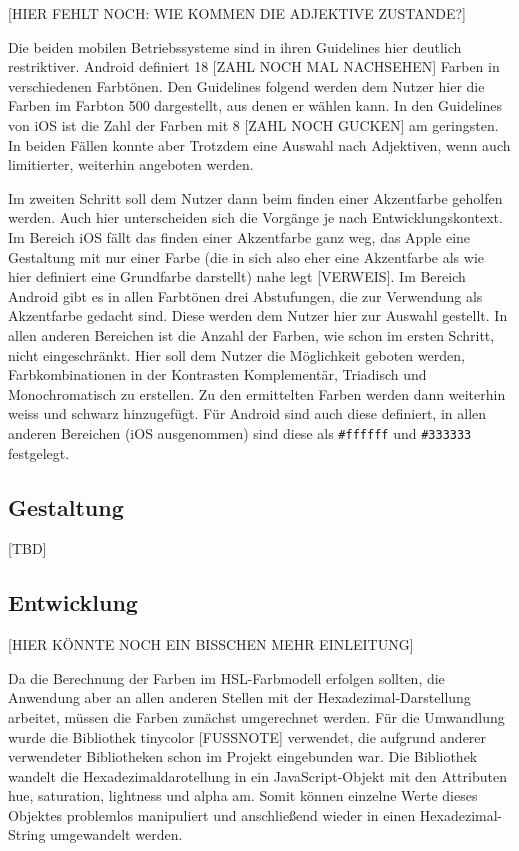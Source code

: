 [HIER FEHLT NOCH: WIE KOMMEN DIE ADJEKTIVE ZUSTANDE?]

Die beiden mobilen Betriebssysteme sind in ihren Guidelines hier deutlich restriktiver. Android definiert 18 [ZAHL NOCH MAL NACHSEHEN] Farben in verschiedenen Farbtönen. Den Guidelines folgend werden dem Nutzer hier die Farben im Farbton 500 dargestellt, aus denen er wählen kann.
In den Guidelines von iOS ist die Zahl der Farben mit 8 [ZAHL NOCH GUCKEN] am geringsten.
In beiden Fällen konnte aber Trotzdem eine Auswahl nach Adjektiven, wenn auch limitierter, weiterhin angeboten werden.

Im zweiten Schritt soll dem Nutzer dann beim finden einer Akzentfarbe geholfen werden. Auch hier unterscheiden sich die Vorgänge je nach Entwicklungskontext.
Im Bereich iOS fällt das finden einer Akzentfarbe ganz weg, das Apple eine Gestaltung mit nur einer Farbe (die in sich also eher eine Akzentfarbe als wie hier definiert eine Grundfarbe darstellt) nahe legt [VERWEIS].
Im Bereich Android gibt es in allen Farbtönen drei Abstufungen, die zur Verwendung als Akzentfarbe gedacht sind. Diese werden dem Nutzer hier zur Auswahl gestellt.
In allen anderen Bereichen ist die Anzahl der Farben, wie schon im ersten Schritt, nicht eingeschränkt.  Hier soll dem Nutzer die Möglichkeit geboten werden, Farbkombinationen in der Kontrasten Komplementär, Triadisch und Monochromatisch zu erstellen.
Zu den ermittelten Farben werden dann weiterhin weiss und schwarz hinzugefügt. Für Android sind auch diese definiert, in allen anderen Bereichen (iOS ausgenommen) sind diese als \verb|#ffffff| und \verb|#333333| festgelegt.

\subsection{Gestaltung}
[TBD]

\subsection{Entwicklung}

[HIER KÖNNTE NOCH EIN BISSCHEN MEHR EINLEITUNG]

Da die Berechnung der Farben im HSL-Farbmodell erfolgen sollten, die Anwendung aber an allen anderen Stellen mit der Hexadezimal-Darstellung arbeitet, müssen die Farben zunächst umgerechnet werden. Für die Umwandlung wurde die Bibliothek tinycolor [FUSSNOTE] verwendet, die aufgrund anderer verwendeter Bibliotheken schon im Projekt eingebunden war.
Die Bibliothek wandelt die Hexadezimaldarotellung in ein JavaScript-Objekt mit den Attributen hue, saturation, lightness und alpha am. Somit können einzelne Werte dieses Objektes problemlos manipuliert und anschließend wieder in einen Hexadezimal-String umgewandelt werden.


